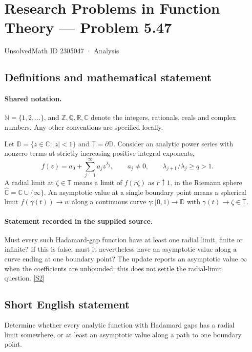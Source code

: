 \documentclass[11pt]{book}
\newcommand{\sref}[2]{\hyperlink{source:#1:#2}{[S#2]}}
\begin{document}
\setcounter{section}{2305046}
\section{Research Problems in Function Theory — Problem 5.47}\label{2305047}
{\small\sffamily UnsolvedMath ID 2305047 · Analysis}
\subsection{Definitions and mathematical statement}

\paragraph{Shared notation.}$\mathbb N=\{1,2,\ldots\}$, and $\mathbb Z,\mathbb Q,\mathbb R,\mathbb C$ denote the integers, rationals, reals and complex numbers. Any other conventions are specified locally.


Let $\mathbb D=\{z\in\mathbb C:|z|<1\}$ and $\mathbb T=\partial\mathbb D$. Consider an analytic power series with nonzero terms at strictly increasing positive integral exponents, \[f(z)=a_0+\sum_{j=1}^{\infty}a_jz^{\lambda_j},\qquad a_j\ne0,\qquad\lambda_{j+1}/\lambda_j\ge q>1.\] A radial limit at $\zeta\in\mathbb T$ means a limit of $f(r\zeta)$ as $r\uparrow1$, in the Riemann sphere $\widehat{\mathbb C}=\mathbb C\cup\{\infty\}$. An asymptotic value at a single boundary point means a spherical limit $f(\gamma(t))\to w$ along a continuous curve $\gamma:[0,1)\to\mathbb D$ with $\gamma(t)\to\zeta\in\mathbb T$.
\paragraph{Statement recorded in the supplied source.}
Must every such Hadamard-gap function have at least one radial limit, finite or infinite? If this is false, must it nevertheless have an asymptotic value along a curve ending at one boundary point? The update reports an asymptotic value $\infty$ when the coefficients are unbounded; this does not settle the radial-limit question. \sref{2305047}{2}
\subsection{Short English statement}
Determine whether every analytic function with Hadamard gaps has a radial limit somewhere, or at least an asymptotic value along a path to one boundary point.
\end{document}
